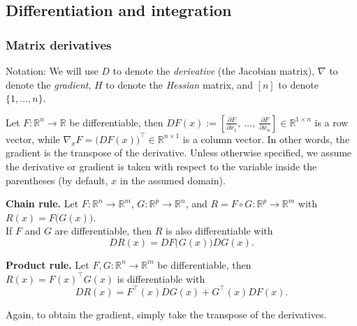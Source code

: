 \documentclass{article}
\newenvironment{mybox}{%
  \par\addvspace{10pt}%
  \begin{mdframed}[skipabove=0pt,skipbelow=10pt]%
}{%
  \end{mdframed}%
}
\theoremstyle{break}
\newcommand{\R}{\ensuremath{\mathbb{R}}}
\begin{document}
\subsection{Differentiation and integration}\label{sec:misc-diff-and-int}
\subsubsection{Matrix derivatives}
Notation: We will use $D$ to denote the \emph{derivative} (the Jacobian matrix), $\nabla$ to denote the \emph{gradient}, $H$ to denote the \emph{Hessian} matrix, and $[n]$ to denote $\{1,\ldots,n\}$.

Let $F:\R^n \to \R$ be differentiable, then $DF(x) := [\frac{\partial F}{\partial x_1},\ \ldots,\ \frac{\partial F}{\partial x_n}] \in \R^{1 \times n}$ is a row vector, while $\nabla_xF = \big(D F(x)\big)^\top \in \R^{n\times 1}$ is a column vector. 
In other words, the gradient is the transpose of the derivative.
Unless otherwise specified, we assume the derivative or gradient is taken with respect to the variable inside the parentheses (by default, $x$ in the assumed domain).






\begin{mybox}
\textbf{Chain rule.}
Let $F: \R^n \to \R^m$, $G: \R^p \to \R^n$, and $R=F \circ G: \R^p \to \R^m$ with $R(x) = F\big( G(x) \big)$.\\
If $F$ and $G$ are differentiable, then $R$ is also differentiable with
\[
DR(x) = DF\big(G(x)\big) DG(x).
\]

\textbf{Product rule.}
Let $F, G: \R^n \to \R^m$ be differentiable, then $R(x) = F(x)^\top G(x)$ is differentiable with
\[
DR(x) = F^\top(x) DG(x) + G^\top(x) DF(x).
\]

Again, to obtain the gradient, simply take the transpose of the derivatives.
\end{mybox}
\end{document}

